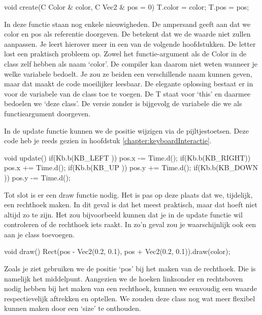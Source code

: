 \begin{code}
void create(C Color & color, C Vec2 & pos = 0) {
  T.color = color;
	T.pos = pos;
}
\end{code}

\begin{note}
In deze functie staan nog enkele nieuwigheden. De ampersand geeft aan dat we color en pos als referentie doorgeven. De  betekent dat we de waarde niet zullen aanpassen. Je leert hierover meer in een van de volgende hoofdstukken. De letter  lost een praktisch probleem op. Zowel het functie-argument als de Color in de class zelf hebben als naam `color'. De compiler kan daarom niet weten wanneer je welke variabele bedoelt. Je zou ze beiden een verschillende naam kunnen geven, maar dat maakt de code moeilijker leesbaar. De elegante oplossing bestaat er in  voor de variabele van de class toe te voegen. De T staat voor `this' en daarmee bedoelen we `deze class'. De versie zonder  is bijgevolg de variabele die we als functieargument doorgeven.
\end{note}

In de update functie kunnen we de positie wijzigen via de pijltjestoetsen. Deze code heb je reeds gezien in hoofdstuk \ref{chapter:keyboardInteractie}.

\begin{code}
void update() {
	if(Kb.b(KB_LEFT )) pos.x -= Time.d();
	if(Kb.b(KB_RIGHT)) pos.x += Time.d();
	if(Kb.b(KB_UP   )) pos.y += Time.d();
	if(Kb.b(KB_DOWN )) pos.y -= Time.d();
}
\end{code}


Tot slot is er een draw functie nodig. Het is pas op deze plaats dat we, tijdelijk, een rechthoek maken. In dit geval is dat het meest praktisch, maar dat hoeft niet altijd zo te zijn. Het zou bijvoorbeeld kunnen dat je in de update functie wil controleren of de rechthoek iets raakt. In zo'n geval zou je waarschijnlijk ook een  aan je class toevoegen.

\begin{code}
void draw() {
  Rect(pos - Vec2(0.2, 0.1), pos + Vec2(0.2, 0.1)).draw(color);
}
\end{code}

Zoals je ziet gebruiken we de positie `pos' bij het maken van de rechthoek. Die is namelijk het middelpunt. Aangezien we de hoeken linksonder en rechtsboven nodig hebben bij het maken van een rechthoek, kunnen we eenvoudig een waarde respectievelijk aftrekken en optellen. We zouden deze class nog wat meer flexibel kunnen maken door een `size' te onthouden.

